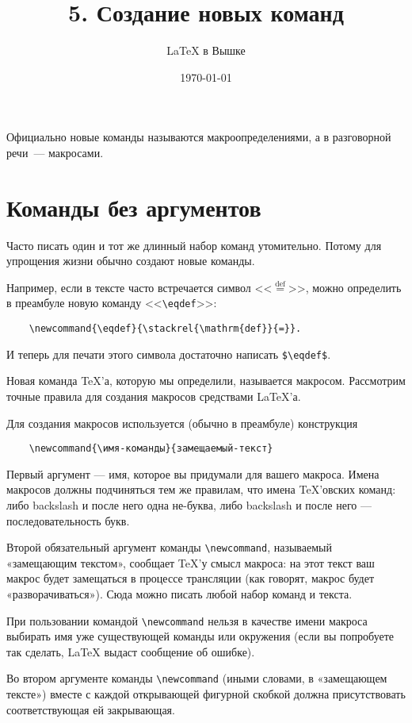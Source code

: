 \documentclass[a4paper,11pt]{article} %
\title{\Huge{5. Создание новых команд}}
\author{\LARGE{\LaTeX{} в Вышке}}
\date{\LARGE\today}
\begin{document}
\maketitle

Официально новые команды называются макроопределениями, а в разговорной речи~--- макросами.

\section{Команды без аргументов}

Часто писать один и тот же длинный набор команд утомительно. Потому для упрощения жизни обычно создают новые команды.

Например, если в тексте часто встречается символ <<$\stackrel{\mathrm{def}}{=}$>>, можно определить в преамбуле новую команду <<\verb"\eqdef">>:
\begin{verbatim}
	\newcommand{\eqdef}{\stackrel{\mathrm{def}}{=}}.
\end{verbatim}
И теперь для печати этого символа достаточно написать \verb"$\eqdef$".

Новая команда \TeX’а, которую мы определили, называется макросом. Рассмотрим точные правила для создания макросов средствами \LaTeX’а.

Для создания макросов используется (обычно в преамбуле) конструкция

\begin{verbatim}
	\newcommand{\имя-команды}{замещаемый-текст}
\end{verbatim}

Первый аргумент --- имя, которое вы придумали для вашего макроса. Имена макросов должны подчиняться тем же правилам, что имена \TeX’овских команд: либо backslash и после него одна не-буква, либо backslash и после него --- последовательность букв.

Второй обязательный аргумент команды \verb"\newcommand", называемый «замещающим текстом», сообщает \TeX’у смысл макроса: на этот текст ваш макрос будет замещаться в процессе трансляции (как говорят, макрос будет «разворачиваться»). Сюда можно писать любой набор команд и текста. 

При пользовании командой \verb"\newcommand" нельзя в качестве имени макроса выбирать имя уже существующей команды или окружения (если вы попробуете так сделать, \LaTeX{} выдаст сообщение об ошибке).

Во втором аргументе команды \verb"\newcommand" (иными словами, в «замещающем тексте») вместе с каждой открывающей фигурной скобкой должна присутствовать соответствующая ей закрывающая.
\end{document}
